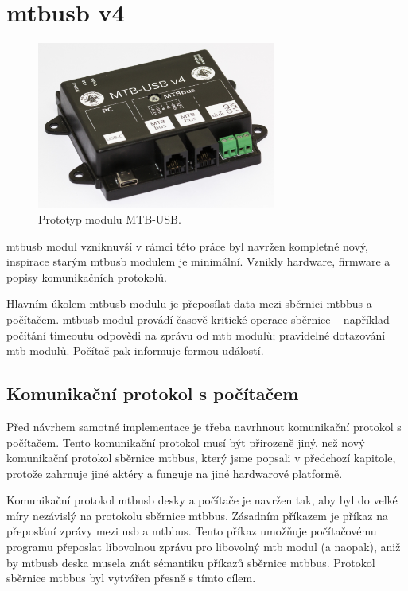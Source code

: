 \section{\gls{mtbusb} v4}

\begin{figure}[ht]
\includegraphics[width=0.7\textwidth]{data/usb-all.jpg}
\caption{Prototyp modulu MTB-USB.}
\label{fig:mtbusb-prototype}
\end{figure}

\gls{mtbusb} modul vzniknuvší v rámci této práce byl navržen kompletně nový,
inspirace starým \gls{mtbusb} modulem je minimální. Vznikly hardware, firmware
a popisy komunikačních protokolů.

Hlavním úkolem \gls{mtbusb} modulu je přeposílat data mezi sběrnici \gls{mtbbus}
a počítačem. \gls{mtbusb} modul provádí časově kritické operace sběrnice
 – například počítání timeoutu odpovědi na zprávu od \gls{mtb} modulů; pravidelné
dotazování \gls{mtb} modulů. Počítač pak informuje formou událostí.

\subsection{Komunikační protokol s počítačem}

Před návrhem samotné implementace je třeba navrhnout komunikační protokol
s počítačem. Tento komunikační protokol musí být přirozeně jiný, než nový
komunikační protokol sběrnice \gls{mtbbus}, který jsme popsali v předchozí
kapitole, protože zahrnuje jiné aktéry a funguje na jiné hardwarové platformě.

Komunikační protokol \gls{mtbusb} desky a počítače je navržen tak, aby byl do
velké míry nezávislý na protokolu sběrnice \gls{mtbbus}. Zásadním příkazem
je příkaz na přeposlání zprávy mezi \gls{usb} a \gls{mtbbus}. Tento příkaz umožňuje
počítačovému programu přeposlat libovolnou zprávu pro libovolný \gls{mtb} modul
(a naopak), aniž by \gls{mtbusb} deska musela znát sémantiku příkazů sběrnice
\gls{mtbbus}. Protokol sběrnice \gls{mtbbus} byl vytvářen přesně s tímto
cílem.

